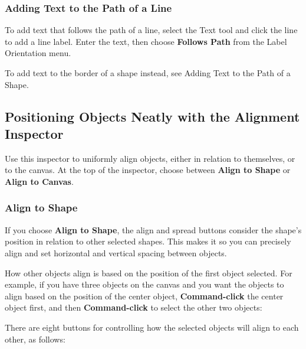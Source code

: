 \documentclass[../main.tex]{subfiles}
\begin{document}
\subsubsection{Adding Text to the Path of a Line}

To add text that follows the path of a line, select the Text tool and click the line to add a
line label. Enter the text, then choose \textbf{Follows Path} from the Label Orientation menu.


\begin{ogtip}
  To add text to the border of a shape instead, see Adding Text to the Path of a Shape.
\end{ogtip}

\subsection{Positioning Objects Neatly with the Alignment Inspector}

Use this inspector to uniformly align objects, either in relation to themselves, or to the
canvas. At the top of the inspector, choose between \textbf{Align to Shape} or \textbf{Align
to Canvas}.

\subsubsection{Align to Shape}

If you choose \textbf{Align to Shape}, the align and spread buttons consider the shape's
position in relation to other selected shapes. This makes it so you can precisely align and
set horizontal and vertical spacing between objects.


How other objects align is based on the position of the first object selected. For example, if
you have three objects on the canvas and you want the objects to align based on the position
of the center object, \textbf{Command-click} the center object first, and then
\textbf{Command-click} to select the other two objects:


There are eight buttons for controlling how the selected objects will align to each other, as
follows:
\end{document}
